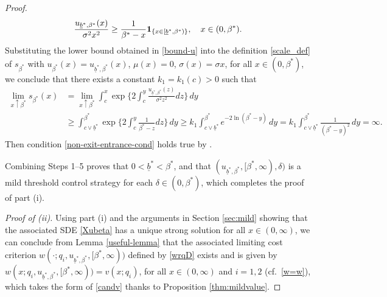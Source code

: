 \documentclass[11pt]{article} %
\def\ub{\underline{b}}
\numberwithin{komcounter}{section}
\begin{document}
\begin{proof}
\begin{equation} \label{bound-u}
\frac{u_{\ub^*,\beta^*}(x)}{\sigma^2 x^2} 
\geq \frac{1}{\beta^* - x} {\bf 1}_{\{x \in [\ub^*,\beta^*)\}}, \quad x \in (0,\beta^*) .
\end{equation}
Substituting the lower bound obtained in \eqref{bound-u} into the definition \eqref{scale_def} of $s_{\beta^*}$ with $u_{\beta^*}(x) = u_{\ub^*,\beta^*}(x)$, $\mu(x)=0$, $\sigma(x) = \sigma x$, for all $x \in (0,\beta^*)$, 
we conclude that there exists a constant $k_1 = k_1(c)>0$ such that
\begin{align*}
\lim_{x\uparrow \beta^*} s_{\beta^*}(x) 
&= \lim_{x\uparrow \beta^*} \int_{c}^{x} \exp \bigg\{2 \int_{c}^{y} \frac{u_{\ub^*,\beta^*}(z)}{\sigma^2 z^2} dz \bigg\} \, dy \\
&\geq \int_{c \vee \ub^*}^{\beta^*} \exp \bigg\{2 \int_{c}^{y} \frac{1}{\beta^* - z} dz \bigg\} \, dy 
\geq k_1 \int_{c \vee \ub^*}^{\beta^*} e^{-2 \ln(\beta^* - y)} \, dy
= k_1 \int_{c \vee \ub^*}^{\beta^*} \frac{1}{(\beta^* - y)^2}\, dy 
= \infty.
\end{align*}
Then condition \eqref{non-exit-entrance-cond} holds true by \cite[Problem 5.27 (Section 5.5)]{Karatzas2}. 

\vspace{1mm}
Combining Steps 1--5 proves that $0< \ub^* < \beta^*$, and that $(u_{\ub^*,\beta^*},[\beta^*,\infty),\delta)$ is a mild threshold control strategy for each $\delta \in (0,\beta^*)$, which completes the proof of part (i).

\vspace{1mm}
{\it Proof of (ii).} 
Using part (i) and the arguments in Section \ref{sec:mild} showing that the associated SDE \eqref{Xubeta} has a unique strong solution for all $x \in (0,\infty)$, we can conclude from Lemma \ref{useful-lemma} that the associated limiting cost criterion $w(\cdot;q_i,u_{\ub^*,\beta^*},[\beta^*,\infty))$ defined by \eqref{wrqD} exists and is given by $w(x;q_i,u_{\ub^*,\beta^*},[\beta^*,\infty)) = v(x;q_i)$, for all $x \in (0,\infty)$ and $i=1,2$ (cf.~\eqref{w=w}), which takes the form of \eqref{candv} thanks to Proposition \ref{thm:mildvalue}.


\end{proof}
\end{document}

